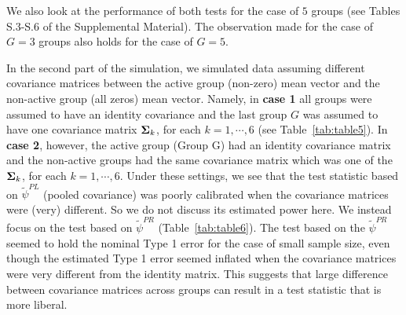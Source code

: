 \documentclass[times,sort&compress,3p]{elsarticle}
\theoremstyle{plain}%
\theoremstyle{definition}
\newcommand{\uSigma}            {\mbox{\boldmath$\Sigma$}}
\begin{document}
We also look at the performance of both tests for the case of $5$ groups (see Tables S.3-S.6 of the Supplemental Material). The observation made for the case of $G=3$ groups also holds for the case of $G = 5$.

In the second part of the simulation, we simulated data assuming different covariance matrices between the active group (non-zero) mean vector and the non-active group (all zeros) mean vector. Namely, in {\bf case 1} all groups were assumed to have an identity covariance and the last group $G$ was assumed to have one covariance matrix $\uSigma_k$, for each $k = 1, \cdots, 6$ (see Table~\ref{tab:table5}). 
In {\bf case 2}, however, the active group (Group G) had an identity covariance matrix and the non-active groups had the same covariance matrix which was one of the $\uSigma_k$, for each $k = 1, \cdots, 6$. Under these settings, we see that the test statistic based on $\widetilde{\psi}^{PL}$  (pooled covariance) was poorly calibrated when the covariance matrices were (very) different. So we do not discuss its estimated power here. We instead focus on the test based on $\widetilde{\psi}^{PR}$ (Table~\ref{tab:table6}). The test based on the $\widetilde{\psi}^{PR}$ seemed to hold the nominal Type 1 error for the case of small sample size, even though the estimated Type 1 error seemed inflated when the covariance matrices were very different from the identity matrix. This suggests that large difference between covariance matrices across groups can result in a test statistic that is more liberal. 
\end{document}
